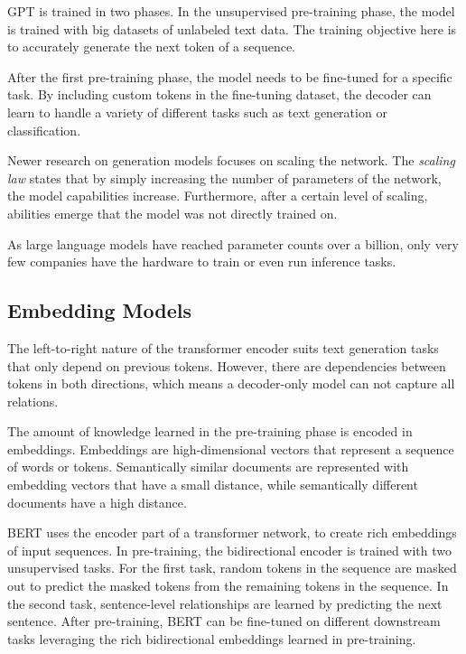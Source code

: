 \documentclass[../main.tex]{subfiles}
\begin{document}
GPT is trained in two phases.
In the unsupervised pre-training phase,
the model is trained with big datasets of unlabeled text data.
The training objective here is
to accurately generate the next token of a sequence.

After the first pre-training phase,
the model needs to be fine-tuned for a specific task.
By including custom tokens in the fine-tuning dataset,
the decoder can learn to handle a variety of different tasks
such as text generation or classification.

Newer research on generation models focuses on scaling the network.
The \emph{scaling law} states
that by simply increasing the number of parameters of the network,
the model capabilities increase.
Furthermore,
after a certain level of scaling,
abilities emerge that the model was not directly trained on.

As large language models have reached parameter counts over a billion,
only very few companies have the hardware to train or even run inference tasks.

\subsection{Embedding Models}
\label{subsec:embedding}

The left-to-right nature of the transformer encoder suits text generation tasks that only depend on previous tokens.
However, there are dependencies between tokens in both directions,
which means a decoder-only model can not capture all relations.

The amount of knowledge learned in the pre-training phase is encoded in embeddings.
Embeddings are high-dimensional vectors that represent a sequence of words or tokens.
Semantically similar documents are represented with embedding vectors that have a small distance,
while semantically different documents have a high distance.

BERT \cite{Devlin2019} uses the encoder part of a transformer network, to create rich embeddings of input sequences.
In pre-training, the bidirectional encoder is trained with two unsupervised tasks.
For the first task,
random tokens in the sequence are masked out to predict the masked tokens from the remaining tokens in the sequence.
In the second task, sentence-level relationships are learned by predicting the next sentence.
After pre-training, BERT can be fine-tuned on different downstream tasks
leveraging the rich bidirectional embeddings learned in pre-training.
\end{document}
